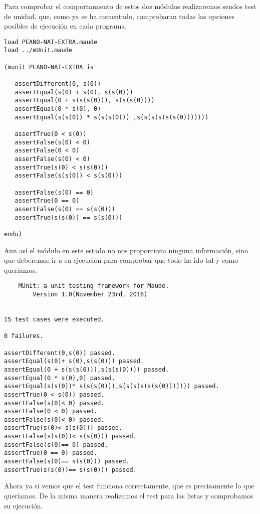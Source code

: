 Para comprobar el comportamiento de estos dos m\'odulos realizaremos sendos test de unidad, que, como ya se ha comentado, comprobaran todas las opciones posibles de ejecuci\'on en cada programa. \par

\begin{verbatim}
load PEANO-NAT-EXTRA.maude
load ../mUnit.maude

(munit PEANO-NAT-EXTRA is

   assertDifferent(0, s(0))
   assertEqual(s(0) + s(0), s(s(0)))
   assertEqual(0 + s(s(s(0))), s(s(s(0))))
   assertEqual(0 * s(0), 0)
   assertEqual(s(s(0)) * s(s(s(0))) ,s(s(s(s(s(s(0)))))))

   assertTrue(0 < s(0))
   assertFalse(s(0) < 0)
   assertFalse(0 < 0)
   assertFalse(s(0) < 0)
   assertTrue(s(0) < s(s(0)))
   assertFalse(s(s(0)) < s(s(0)))
   
   assertFalse(s(0) == 0)
   assertTrue(0 == 0)
   assertFalse(s(0) == s(s(0)))
   assertTrue(s(s(0)) == s(s(0)))
   
endu)
\end{verbatim}

Aun as\' i el m\'odulo en este estado no nos proporciona ninguna informaci\'on, sino que deberemos ir a su ejecuci\'on para comprobar que todo ha ido tal y como quer\'iamos. \par

\begin{verbatim}
	MUnit: a unit testing framework for Maude.
		Version 1.0(November 23rd, 2016)


15 test cases were executed.

0 failures.

assertDifferent(0,s(0)) passed.
assertEqual(s(0)+ s(0),s(s(0))) passed.
assertEqual(0 + s(s(s(0))),s(s(s(0)))) passed.
assertEqual(0 * s(0),0) passed.
assertEqual(s(s(0))* s(s(s(0))),s(s(s(s(s(s(0))))))) passed.
assertTrue(0 < s(0)) passed.
assertFalse(s(0)< 0) passed.
assertFalse(0 < 0) passed.
assertFalse(s(0)< 0) passed.
assertTrue(s(0)< s(s(0))) passed.
assertFalse(s(s(0))< s(s(0))) passed.
assertFalse(s(0)== 0) passed.
assertTrue(0 == 0) passed.
assertFalse(s(0)== s(s(0))) passed.
assertTrue(s(s(0))== s(s(0))) passed.
\end{verbatim}

Ahora ya si vemos que el test funciona correctamente, que es precisamente lo que quer\'iamos. De la misma manera realizamos el test para las listas y comprobamos su ejecuci\'on. \par


